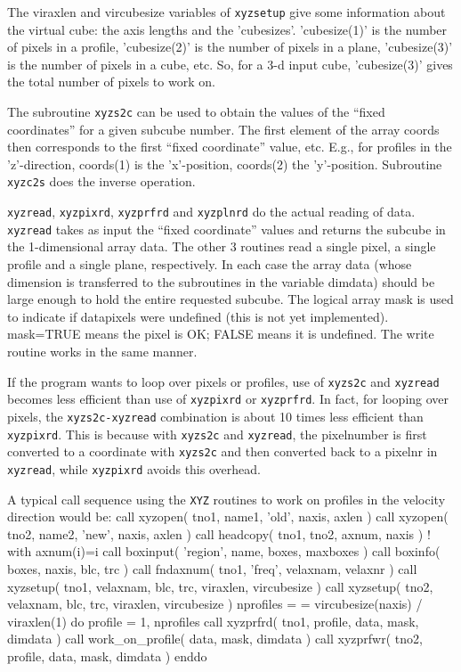 The viraxlen and vircubesize variables of {\tt xyzsetup} give some information
about the virtual cube:  the axis lengths and the 'cubesizes'. 'cubesize(1)'
is the number of pixels in a profile, 'cubesize(2)' is the number of pixels
in a plane, 'cubesize(3)' is the number of pixels in a cube, etc. So, for
a 3-d input cube, 'cubesize(3)' gives the total number of pixels to work on.

The subroutine {\tt xyzs2c} can be used to obtain the values of the ``fixed
coordinates'' for a given subcube number.  The first element of the array
coords then corresponds to the first ``fixed coordinate'' value, etc.
E.g., for profiles in the 'z'-direction, coords(1) is the 'x'-position,
coords(2) the 'y'-position. Subroutine {\tt xyzc2s} does the inverse operation.

{\tt xyzread}, {\tt xyzpixrd}, {\tt xyzprfrd} and {\tt xyzplnrd} do the
actual reading of data.  {\tt xyzread} takes as input the ``fixed coordinate''
values and returns the subcube in the 1-dimensional array data. The other
3 routines read a single pixel, a single profile and a single plane,
respectively.  In each case the array data (whose dimension is transferred
to the subroutines in the variable dimdata) should be large enough to hold
the entire requested subcube. The logical array mask is used to indicate if
datapixels were undefined (this is not yet implemented).  mask=TRUE means
the pixel is OK; FALSE means it is undefined.  The write routine works in
the same manner.

If the program wants to loop over pixels or profiles, use of {\tt xyzs2c}
and {\tt xyzread} becomes less efficient than use of {\tt xyzpixrd} or
{\tt xyzprfrd}. In fact, for looping over pixels, the {\tt xyzs2c-xyzread}
combination is about 10 times less efficient than {\tt xyzpixrd}. This is
because with {\tt xyzs2c} and {\tt xyzread}, the pixelnumber is first
converted to a coordinate with {\tt xyzs2c} and then converted back to a
pixelnr in {\tt xyzread}, while {\tt xyzpixrd} avoids this overhead.

A typical call sequence using the {\tt XYZ} routines to work on profiles
in the velocity direction would be:
{\ninepoint\begintt
      call xyzopen(  tno1, name1, 'old', naxis, axlen )
      call xyzopen(  tno2, name2, 'new', naxis, axlen )
      call headcopy( tno1, tno2, axnum, naxis )          ! with axnum(i)=i
      call boxinput( 'region', name, boxes, maxboxes )
      call boxinfo(  boxes, naxis, blc, trc )
      call fndaxnum( tno1, 'freq', velaxnam, velaxnr )
      call xyzsetup( tno1, velaxnam, blc, trc, viraxlen, vircubesize )
      call xyzsetup( tno2, velaxnam, blc, trc, viraxlen, vircubesize )
      nprofiles = = vircubesize(naxis) / viraxlen(1)
      do profile = 1, nprofiles
          call xyzprfrd( tno1, profile, data, mask, dimdata )
          call work_on_profile( data, mask, dimdata )
          call xyzprfwr( tno2, profile, data, mask, dimdata )
      enddo
\endtt}

